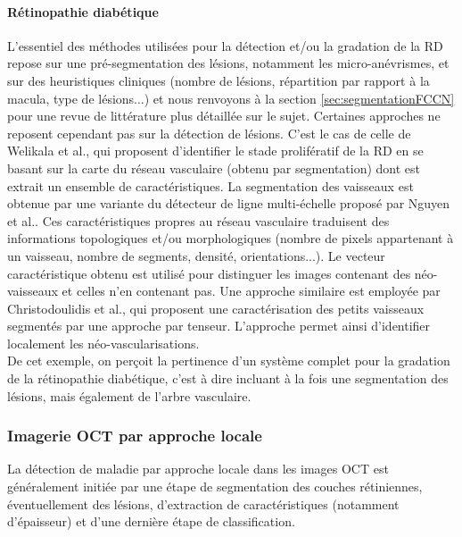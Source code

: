 \paragraph{Rétinopathie diabétique} L'essentiel des méthodes utilisées pour la détection et/ou la gradation de la \ac{RD} repose sur une pré-segmentation des lésions, notamment les micro-anévrismes, et sur des heuristiques cliniques (nombre de lésions, répartition par rapport à la macula, type de lésions...) et nous renvoyons à la section \ref{sec:segmentationFCCN} pour une revue de littérature plus détaillée sur le sujet. Certaines approches ne reposent cependant pas sur la détection de lésions. C'est le cas de celle de Welikala et al.\cite{welikalaAutomatedDetectionProliferative2014}, qui proposent d'identifier le stade prolifératif de la \ac{RD} en se basant sur la carte du réseau vasculaire (obtenu par segmentation) dont est extrait un ensemble de caractéristiques. La segmentation des vaisseaux est obtenue par une variante du détecteur de ligne multi-échelle proposé par Nguyen et al.\cite{nguyenEffectiveRetinalBlood2013}. Ces caractéristiques propres au réseau vasculaire traduisent des informations topologiques et/ou morphologiques (nombre de pixels appartenant à  un vaisseau, nombre de segments, densité, orientations...). Le vecteur caractéristique obtenu est utilisé pour distinguer les images contenant des néo-vaisseaux et celles n'en contenant pas. Une approche similaire est employée par Christodoulidis et al.\cite{christodoulidisMultiscaleTensorVoting2016}, qui proposent une caractérisation des petits vaisseaux segmentés par une approche par tenseur. L'approche permet ainsi d'identifier localement les néo-vascularisations. \\
De cet exemple, on perçoit la pertinence d'un système complet pour la gradation de la rétinopathie diabétique, c'est à dire incluant à la fois une segmentation des lésions, mais également de l'arbre vasculaire.


\subsubsection{Imagerie \ac{OCT} par approche locale}

La détection de maladie par approche locale dans les images \ac{OCT} est généralement initiée par une étape de segmentation des couches rétiniennes, éventuellement des lésions, d'extraction de caractéristiques (notamment d'épaisseur) et d'une dernière étape de classification.

